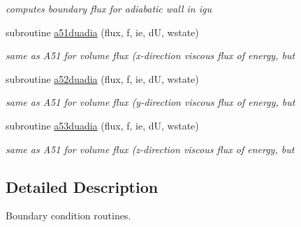 \begin{DoxyCompactItemize}
\begin{DoxyCompactList}\small\item\em computes boundary flux for adiabatic wall in igu \end{DoxyCompactList}\item 
subroutine \hyperlink{group__bcond_ga224b6cf6476419f057df67c7a0d05504}{a51duadia} (flux, f, ie, d\-U, wstate)
\begin{DoxyCompactList}\small\item\em same as A51 for volume flux (x-\/direction viscous flux of energy, but \end{DoxyCompactList}\item 
subroutine \hyperlink{group__bcond_gaaaddd14c010da1bce6192846a45b63f2}{a52duadia} (flux, f, ie, d\-U, wstate)
\begin{DoxyCompactList}\small\item\em same as A51 for volume flux (y-\/direction viscous flux of energy, but \end{DoxyCompactList}\item 
subroutine \hyperlink{group__bcond_ga4311cb4d64847bc8b17c653ca9185866}{a53duadia} (flux, f, ie, d\-U, wstate)
\begin{DoxyCompactList}\small\item\em same as A51 for volume flux (z-\/direction viscous flux of energy, but \end{DoxyCompactList}\end{DoxyCompactItemize}


\subsection{Detailed Description}
Boundary condition routines. 